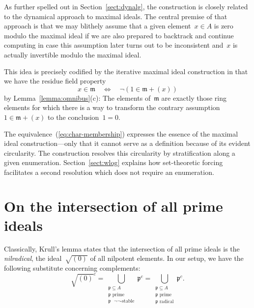 \documentclass[com,11pt,crcready]{iosart2x}
\theoremstyle{definition}
\theoremstyle{plain}
\theoremstyle{remark}
\newcommand{\?}{\,{:}\,}
\newcommand{\mmm}{\mathfrak{m}}
\newcommand{\ppp}{\mathfrak{p}}
\renewcommand{\_}{\mathpunct{.}\,}
\begin{document}
As further spelled out in Section~\ref{sect:dynalg}, the construction is
closely related to the dynamical approach to maximal ideals. The central
premise of that approach is that we may blithely assume that a given element~$x
\in A$ is zero modulo the maximal ideal if we are also prepared to backtrack
and continue computing in case this assumption later turns out to be
inconsistent and~$x$ is actually invertible modulo the maximal ideal.

This idea is precisely codified by the iterative maximal ideal construction in
that we have the residue field property
\begin{equation}
  \label{eq:char-membership}
  \tag{$\dagger$}
  x \in \mmm \quad\Longleftrightarrow\quad \neg(1 \in \mmm + (x))
\end{equation}
by Lemma~\ref{lemma:omnibus}(c): The elements of~$\mmm$ are exactly those ring
elements for which there is a way to transform the contrary assumption~$1 \in
\mmm + (x)$ to the conclusion~$1 = 0$.

The equivalence~(\ref{eq:char-membership}) expresses the essence of the maximal
ideal construction---only that it cannot serve as a definition because of its
evident circularity. The construction resolves this circularity by
stratification along a given enumeration. Section~\ref{sect:wlog} explains how
set-theoretic forcing facilitates a second resolution which does not require an
enumeration.


\section{On the intersection of all prime ideals}
\label{sect:krull}

Classically, Krull's lemma states that the intersection of all prime ideals is the
\emph{nilradical}, the ideal~$\sqrt{(0)}$ of all nilpotent elements. In our
setup, we have the following substitute concerning complements:
\[ \sqrt{(0)}^c =
  \bigcup_{\substack{\text{$\ppp \subseteq A$}\\\text{$\ppp$ prime}\\\text{$\ppp$ $\neg\neg$-stable}}} \ppp^c =
  \bigcup_{\substack{\text{$\ppp \subseteq A$}\\\text{$\ppp$ prime}\\\text{$\ppp$ radical}}} \ppp^c. \]
\end{document}
